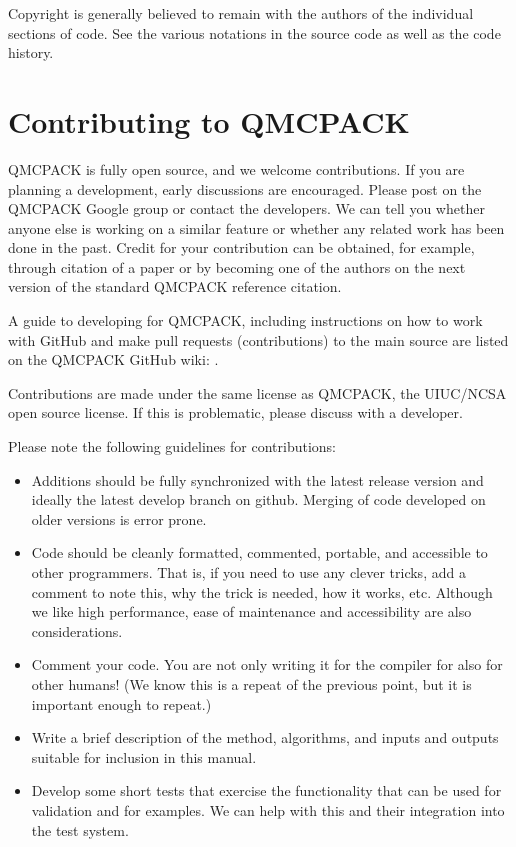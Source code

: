 \documentclass[letterpaper,10pt,english]{sphinxmanual}
\begin{document}
Copyright is generally believed to remain with the authors of the
individual sections of code. See the various notations in the source
code as well as the code history.


\section{Contributing to QMCPACK}
\label{\detokenize{introduction:contributing-to-qmcpack}}\label{\detokenize{introduction:contributing}}
QMCPACK is fully open source, and we welcome contributions. If you are
planning a development, early discussions are encouraged. Please post on
the QMCPACK Google group or contact the developers. We can tell you
whether anyone else is working on a similar feature or whether any
related work has been done in the past. Credit for your contribution can
be obtained, for example, through citation of a paper or by becoming one
of the authors on the next version of the standard QMCPACK reference
citation.

A guide to developing for QMCPACK, including instructions on how to work
with GitHub and make pull requests (contributions) to the main source
are listed on the QMCPACK GitHub wiki:
.

Contributions are made under the same license as QMCPACK, the UIUC/NCSA
open source license. If this is problematic, please discuss with a
developer.

Please note the following guidelines for contributions:
\begin{itemize}
\item {} 
Additions should be fully synchronized with the latest release
version and ideally the latest develop branch on github. Merging of
code developed on older versions is error prone.

\item {} 
Code should be cleanly formatted, commented, portable, and accessible
to other programmers. That is, if you need to use any clever tricks,
add a comment to note this, why the trick is needed, how it works,
etc. Although we like high performance, ease of maintenance and
accessibility are also considerations.

\item {} 
Comment your code. You are not only writing it for the compiler for
also for other humans! (We know this is a repeat of the previous
point, but it is important enough to repeat.)

\item {} 
Write a brief description of the method, algorithms, and inputs and
outputs suitable for inclusion in this manual.

\item {} 
Develop some short tests that exercise the functionality that can be
used for validation and for examples. We can help with this and their
integration into the test system.

\end{itemize}
\end{document}
